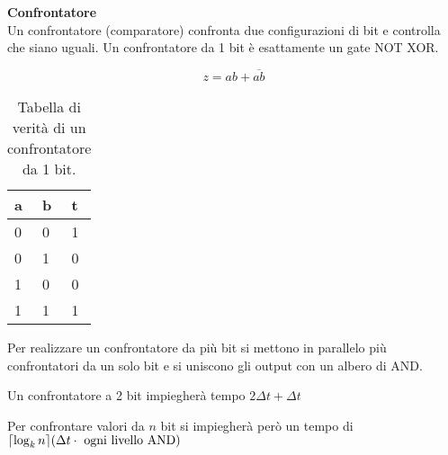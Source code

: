 \begin{defn}
	\textbf{Confrontatore} \\

	Un confrontatore (comparatore) confronta due configurazioni di bit e
	controlla che siano uguali. Un confrontatore da 1 bit è esattamente un gate
	NOT XOR.
	
	\[ z = ab + \overbar{ab} \]
	
	\begin{table}[H]
		\centering
		\caption{Tabella di verità di un confrontatore da 1 bit.}
		\label{tab:2bitcomparator}
		\begin{tabular}{|ll|l|}
			\hline
			a & b & t \\ \hline
			0 & 0 & 1 \\
			0 & 1 & 0 \\
			1 & 0 & 0 \\
			1 & 1 & 1 \\ \hline
		\end{tabular}
	\end{table}
	
	
	Per realizzare un confrontatore da più bit si mettono in parallelo più
	confrontatori da un solo bit e si uniscono gli output con un albero di AND.
	
	Un confrontatore a 2 bit impiegherà tempo $ 2\Delta t + \Delta t $
	
	Per confrontare valori da $ n $ bit si impiegherà però un tempo di $
	\lceil\log_kn\rceil(\Delta t \cdot \text{ ogni livello AND})$
\end{defn}

